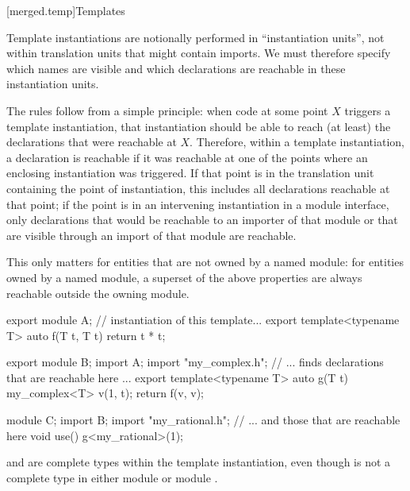 [merged.temp]{Templates}

\pnum
Template instantiations are notionally performed in ``instantiation units'',
not within translation units that might contain imports.
We must therefore specify
which names are visible and
which declarations are reachable
in these instantiation units.

\pnum
The rules follow from a simple principle:
when code at some point $X$ triggers a template instantiation,
that instantiation should be able to reach (at least)
the declarations that were reachable at $X$.
Therefore, within a template instantiation,
a declaration is reachable if
it was reachable at one of the points where
an enclosing instantiation was triggered.
If that point is in the translation unit
containing the point of instantiation,
this includes all declarations reachable
at that point;
if the point is in an intervening instantiation
in a module interface,
only declarations that would be reachable
to an importer of that module
or that are visible through an import of that module
are reachable.
\begin{note}
This only matters for entities that are
not owned by a named module:
for entities owned by a named module,
a superset of the above properties
are always reachable outside the owning module.
\end{note}

\pnum
\begin{example}
\begin{codeblock}
export module A;
// instantiation of this template...
export template<typename T> auto f(T t, T t) {
  return t * t;
}
\end{codeblock}

\begin{codeblock}
export module B;
import A;
import "my_complex.h";
// ... finds declarations that are reachable here ...
export template<typename T> auto g(T t) {
  my_complex<T> v(1, t);
  return f(v, v);
}
\end{codeblock}

\begin{codeblock}
module C;
import B;
import "my_rational.h";
// ... and those that are reachable here
void use() {
  g<my_rational>(1);
}
\end{codeblock}

 and  are complete
types within the template instantiation,
even though
 is not a complete type
in either module  or module .
\end{example}

